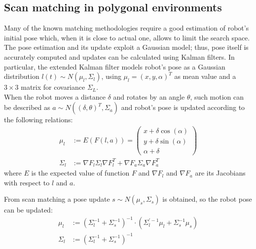 \documentclass[a4paper, onecolumn]{report}
\begin{document}
\subsection{Scan matching in polygonal environments}
Many of the known matching methodologies require a good estimation of robot's initial pose which, when it is close to actual one, allows to limit the search space. The pose estimation and its update exploit a Gaussian model; thus, pose itself is accurately computed and updates can be calculated using Kalman filters. In particular, the extended Kalman filter models robot's pose as a Gaussian distribution $l(t) \sim N(\mu_l,\Sigma_l)$, using $\mu_l = (x,y,\alpha)^T$ as mean value and a $3\times3$ matrix for covariance $\Sigma_L$.\\
When the robot moves a distance $\delta$ and rotates by an angle $\theta$, such motion can be described as $a \sim N((\delta, \theta)^T, \Sigma_a)$ and robot's pose is updated according to the following relations:
\begin{equation}          
	\begin{aligned}              
		\mu_l &:= E(F(l,a)) = \left(\begin{matrix}x+\delta\cos(\alpha) \\ y + \delta\sin(\alpha) \\ \alpha + \delta\end{matrix}\right) \\
		\Sigma_l &:= \nabla F_l\Sigma_l\nabla F_l^T + \nabla F_a\Sigma_a \nabla F_a^T
	\end{aligned}
\end{equation}
where $E$ is the expected value of function $F$ and $\nabla F_l$ and $\nabla F_a$ are its Jacobians with respect to $l$ and $a$.

From scan matching a pose update $s \sim N(\mu_s, \Sigma_s)$ is obtained, so the robot pose can be updated:
\begin{equation}
	\begin{aligned}
		\mu_l &:= (\Sigma_l^{-1} + \Sigma_s^{-1})^{-1} \cdot (\Sigma_l^{'-1}\mu_l + \Sigma_s^{-1}\mu_s) \\
		\Sigma_l &:= (\Sigma_l^{-1} + \Sigma_s^{-1})^{-1}
	\end{aligned}
\end{equation}
\end{document}
